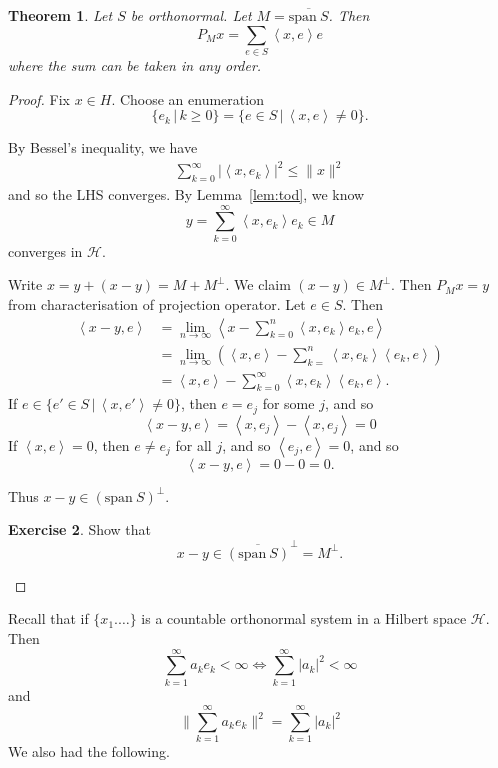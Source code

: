\documentclass[justified]{tufte-book}
\theoremstyle{plain}%
\newtheorem{thm}{Theorem}[chapter]
\theoremstyle{definition}
\newtheorem{exer}[thm]{Exercise}
\theoremstyle{remark}
\renewcommand{\H}{\mathcal{H}}
\newcommand{\iprod}[1]{\left\langle #1 \right\rangle}
\newcommand{\spans}{\text{span}\ }
\begin{document}
\begin{thm}
  Let $S$ be orthonormal.  Let $M = \overline{\spans S}$.  Then \[
      P_M x = \sum_{e \in S} \iprod{x,e} e
  \] where the sum can be taken in any order.
\end{thm}
\begin{proof}
  Fix $x \in H$.  Choose an enumeration $$\{ e_k \, | \, k \geq 0 \} = \{ e \in S \, | \, \iprod{x,e} \neq 0 \}.$$
  
  By Bessel's inequality, we have \begin{align*}
      \sum_{k=0}^\infty | \iprod{x, e_k} |^2 \leq \| x \|^2
  \end{align*} and so the LHS converges.  By Lemma~\ref{lem:tod}, we know \[
      y = \sum_{ k = 0}^\infty \iprod{x,e_k} e_k \in M
  \] converges in $\H$.  
  
  Write $x = y + (x-y) = M + M^\perp$.  We claim $(x-y) \in M^\perp$.  Then $P_Mx = y$ from characterisation of projection operator.  Let $e \in S$.  Then \begin{align*}
      \iprod{x-y, e} &= \lim_{n \rightarrow \infty} \iprod{ x - \sum_{k=0}^n \iprod{x, e_k} e_k, e} \\    
      &= \lim_{n \rightarrow \infty} ( \iprod{x,e} - \sum_{k=}^n \iprod{x, e_k} \iprod{e_k, e}) \\
      &= \iprod{x,e} - \sum_{k=0}^\infty \iprod{x, e_k} \iprod{e_k, e}.
  \end{align*}
  If $e \in \{ e' \in S \, | \, \iprod{x, e'} \neq 0 \}$, then $e = e_j$ for some $j$, and so \[
      \iprod{x-y, e} = \iprod{x, e_j} - \iprod{x, e_j} = 0
  \]  
  If $\iprod{x,e} = 0$, then $e \neq e_j$ for all $j$, and so $\iprod{e_j, e} = 0$, and so \[
      \iprod{x-y, e} = 0 - 0 = 0.
  \]
  
  Thus $x-y \in (\spans S)^\perp$.
  
  \begin{exer}
      Show that \[
          x-y \in \overline{(\spans S)}^\perp = M^\perp.
      \]
  \end{exer}
\end{proof}


Recall that if $\{ x_1. \dots \}$ is a countable orthonormal system in a Hilbert space $\H$.  Then \[
  \sum_{k=1}^\infty a_k e_k < \infty \iff \sum_{k=1}^\infty |a_k|^2 < \infty 
\] and \[
  \| \sum_{k=1}^\infty a_k e_k \|^2 = \sum_{k=1}^\infty |a_k|^2 \tag{$\star$}
\] We also had the following.
\end{document}
